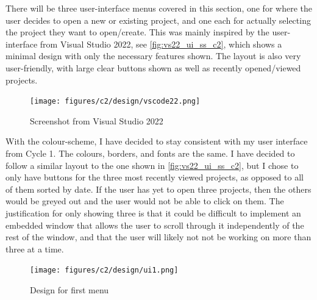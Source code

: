 \documentclass[11pt]{article}
\begin{document}

                There will be three user-interface menus covered in this section, one for where the user decides to open a new or existing project, and one each for actually selecting the project they want to open/create. 
                This was mainly inspired by the user-interface from Visual Studio 2022, see \autoref{fig:vs22_ui_ss_c2}, which shows a minimal design with only the necessary features shown.
                The layout is also very user-friendly, with large clear buttons shown as well as recently opened/viewed projects.

                \begin{figure}[!ht]
                    \centering
                    \texttt{[image: figures/c2/design/vscode22.png]}
                    \caption{Screenshot from Visual Studio 2022}
                    \label{fig:vs22_ui_ss_c2}
                \end{figure}

                With the colour-scheme, I have decided to stay consistent with my user interface from Cycle 1. The colours, borders, and fonts are the same. 
                I have decided to follow a similar layout to the one shown in \autoref{fig:vs22_ui_ss_c2}, but I chose to only have buttons for the three most recently viewed projects, as opposed to all of them sorted by date. 
                If the user has yet to open three projects, then the others would be greyed out and the user would not be able to click on them. 
                The justification for only showing three is that it could be difficult to implement an embedded window that allows the user to scroll through it independently of the rest of the window, and that the user will likely not not be working on more than three at a time. 

                \begin{figure}[!ht]
                    \centering
                    \texttt{[image: figures/c2/design/ui1.png]}
                    \caption{Design for first menu}
                    \label{fig:menu_1_design_c2}
                \end{figure}
\end{document}
